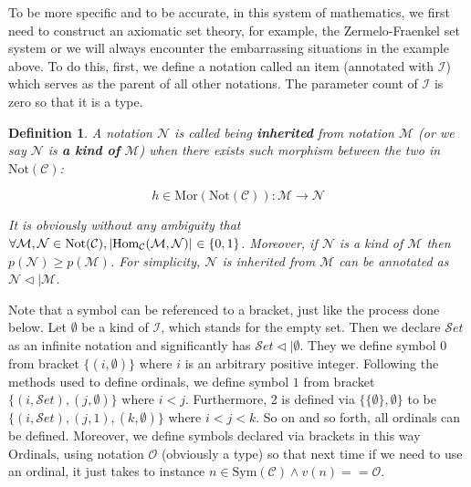 \documentclass{aims}
\newtheorem{definition}{Definition}	%
\numberwithin{theorem}{section}	%
\numberwithin{axiom}{section}	%
\numberwithin{definition}{section}	%
\begin{document}
To be more specific and to be accurate, in this system of mathematics, we first need to construct an axiomatic set theory, for example, the Zermelo-Fraenkel set system or we will always encounter the embarrassing situations in the example above. To do this, first, we define a notation called an item (annotated with \(\mathcal{I}\)) which serves as the parent of all other notations. The parameter count of \(\mathcal{I}\) is zero so that it is a type.

\begin{definition}
	A notation \(\mathcal{N}\) is called being \textbf{ inherited} from notation \(\mathcal{M}\) (or we say \(\mathcal{N}\) is\textbf{  a kind of} \(\mathcal{M}\)) when there exists such morphism between the two in \(\text{Not}(\mathcal{C})\):
	
	\begin{equation}
		h\in \text{Mor}(\text{Not}(\mathcal{C})): \mathcal{M}\to \mathcal{N}
	\end{equation}

	It is obviously without any ambiguity that \(\forall \mathcal{M},\mathcal{N}\in \text{Not}(\mathcal{C}),\left|\text{Hom}_{\mathcal{C}}(\mathcal{M},\mathcal{N})\right|$ $\in \{0,1\}\). Moreover, if \(\mathcal{N}\) is a kind of \(\mathcal{M}\) then \(\mathit{p}(\mathcal{N})\geq \mathit{p}(\mathcal{M})\). For simplicity, \(\mathcal{N}\) is inherited from \(\mathcal{M}\) can be annotated as \(\mathcal{N}\triangleleft |\mathcal{M}\).
\end{definition}

Note that a symbol can be referenced to a bracket, just like the process done below. Let \(\emptyset\) be a kind of \(\mathcal{I}\), which stands for the empty set. Then we declare \(\mathcal{S}\mathit{e}\mathit{t}\) as an infinite notation and significantly has \(\mathcal{S}\mathit{e}\mathit{t}\triangleleft |\emptyset\). They we define symbol \(0\) from bracket \(\{(i,\emptyset )\}\) where \(i\) is an arbitrary positive integer. Following the methods used to define ordinals, we define symbol \(1\) from bracket \(\{(i,\mathcal{S}\mathit{e}\mathit{t}),(j,\emptyset )\}\) where \(i<j\). Furthermore, 2 is defined via \(\{\{\emptyset \},\emptyset \}\) to be \(\{(i,\mathcal{S}\mathit{e}\mathit{t}),(j,1),(k,\emptyset )\}\) where \(i<j<k\). So on and so forth, all ordinals can be defined. Moreover, we define symbols declared via brackets in this way \(\text{Ordinals}\), using notation \(\mathcal{O}\) (obviously a type) so that next time if we need to use an ordinal, it just takes to instance \(n\in \text{Sym}(\mathcal{C})\land \mathit{v}(n)==\mathcal{O}\).
\end{document}
